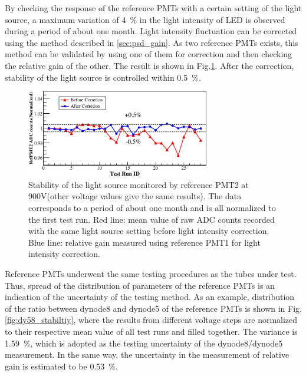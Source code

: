\documentclass[5p, times]{elsarticle}
\begin{document}
By checking the response of the reference PMTs with a certain setting of the light source, a maximum variation of \SI{4}{\percent} in the light intensity of LED is observed during a period of about one month.
Light intensity fluctuation can be corrected using the method described in \ref{sec:psd_gain}.
As two reference PMTs exists, this method can be validated by using one of them for correction and then checking the relative gain of the other. 
The result is shown in Fig.\ref{fig:led_stability}.
After the correction, stability of the light source is controlled within \textpm\SI{0.5}{\percent}.

\begin{figure}
 \centering
 \includegraphics[width=80mm]{led_stability}
\caption{Stability of the light source monitored by reference PMT2 at 900V(other voltage values give the same results).
The data corresponds to a period of about one month and is all normalized to the first test run.
Red line: mean value of raw ADC counts recorded with the same light source setting before light intensity correction.
Blue line: relative gain measured using reference PMT1 for light intensity correction.}
\label{fig:led_stability}
\end{figure} 

Reference PMTs underwent the same testing procedures as the tubes under test.
Thus, spread of the distribution of parameters of the reference PMTs is an indication of the uncertainty of the testing method.
As an example, distribution of the ratio between dynode8 and dynode5 of the reference PMTs is shown in Fig.\ref{fig:dy58_stabiltiy}, where the results from different voltage steps are normalized to their respective mean value of all test runs and filled together.
The variance is \SI{1.59}{\percent}, which is adopted as the testing uncertainty of the dynode8/dynode5 measurement.
In the same way, the uncertainty in the measurement of relative gain is estimated to be \SI{0.53}{\percent}. 
\end{document}
